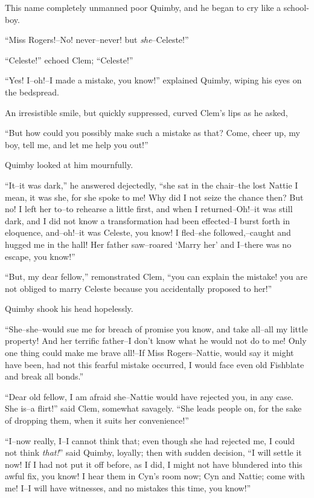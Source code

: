 This name completely unmanned poor Quimby, and he began to cry like a
school-boy.

``Miss Rogers!--No! never--never! but \emph{she}--Celeste!''

``Celeste!'' echoed Clem; ``Celeste!''

``Yes! I--oh!--I made a mistake, you know!'' explained Quimby, wiping his
eyes on the bedspread.

An irresistible smile, but quickly suppressed, curved Clem's lips as he
asked,

``But how could you possibly make such a mistake as that? Come, cheer up,
my boy, tell me, and let me help you out!''

Quimby looked at him mournfully.

``It--it was dark,'' he answered dejectedly, ``she sat in the chair--the
lost Nattie I mean, it was she, for she spoke to me! Why did I not seize
the chance then? But no! I left her to--to rehearse a little first, and
when I returned--Oh!--it was still dark, and I did not know a
transformation had been effected--I burst forth in eloquence,
and--oh!--it was Celeste, you know! I fled--she followed,--caught and
hugged me in the hall! Her father saw--roared `Marry her' and I--there
was no escape, you know!''

``But, my dear fellow,'' remonstrated Clem, ``you can explain the mistake!
you are not obliged to marry Celeste because you accidentally proposed
to her!''

Quimby shook his head hopelessly.

``She--she--would sue me for breach of promise you know, and take
all--all my little property! And her terrific father--I don't know what
he would not do to me! Only one thing could make me brave all!--If Miss
Rogers--Nattie, would say it might have been, had not this fearful
mistake occurred, I would face even old Fishblate and break all bonds.''

``Dear old fellow, I am afraid she--Nattie would have rejected you, in
any case. She is--a flirt!'' said Clem, somewhat savagely. ``She leads
people on, for the sake of dropping them, when it suits her
convenience!''

``I--now really, I--I cannot think that; even though she had rejected me,
I could not think \emph{that!}'' said Quimby, loyally; then with sudden
decision, ``I will settle it now! If I had not put it off before, as I
did, I might not have blundered into this awful fix, you know! I hear
them in Cyn's room now; Cyn and Nattie; come with me! I--I will have
witnesses, and no mistakes this time, you know!''

